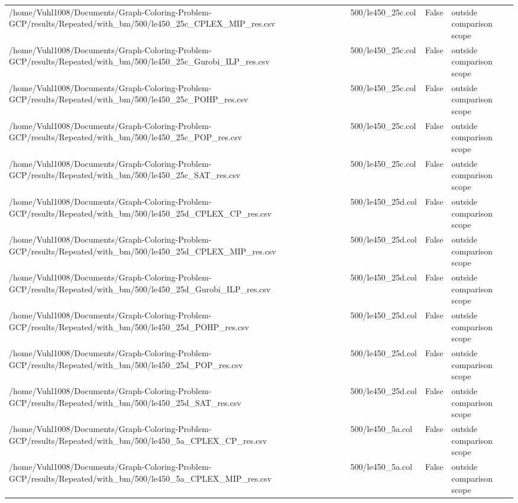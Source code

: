 \begin{table}[htbp]
\begin{tabular}{llll}
/home/Vuhl1008/Documents/Graph-Coloring-Problem-GCP/results/Repeated/with\_bm/500/le450\_25c\_CPLEX\_MIP\_res.csv & 500/le450\_25c.col & False & outside comparison scope \\
/home/Vuhl1008/Documents/Graph-Coloring-Problem-GCP/results/Repeated/with\_bm/500/le450\_25c\_Gurobi\_ILP\_res.csv & 500/le450\_25c.col & False & outside comparison scope \\
/home/Vuhl1008/Documents/Graph-Coloring-Problem-GCP/results/Repeated/with\_bm/500/le450\_25c\_POHP\_res.csv & 500/le450\_25c.col & False & outside comparison scope \\
/home/Vuhl1008/Documents/Graph-Coloring-Problem-GCP/results/Repeated/with\_bm/500/le450\_25c\_POP\_res.csv & 500/le450\_25c.col & False & outside comparison scope \\
/home/Vuhl1008/Documents/Graph-Coloring-Problem-GCP/results/Repeated/with\_bm/500/le450\_25c\_SAT\_res.csv & 500/le450\_25c.col & False & outside comparison scope \\
/home/Vuhl1008/Documents/Graph-Coloring-Problem-GCP/results/Repeated/with\_bm/500/le450\_25d\_CPLEX\_CP\_res.csv & 500/le450\_25d.col & False & outside comparison scope \\
/home/Vuhl1008/Documents/Graph-Coloring-Problem-GCP/results/Repeated/with\_bm/500/le450\_25d\_CPLEX\_MIP\_res.csv & 500/le450\_25d.col & False & outside comparison scope \\
/home/Vuhl1008/Documents/Graph-Coloring-Problem-GCP/results/Repeated/with\_bm/500/le450\_25d\_Gurobi\_ILP\_res.csv & 500/le450\_25d.col & False & outside comparison scope \\
/home/Vuhl1008/Documents/Graph-Coloring-Problem-GCP/results/Repeated/with\_bm/500/le450\_25d\_POHP\_res.csv & 500/le450\_25d.col & False & outside comparison scope \\
/home/Vuhl1008/Documents/Graph-Coloring-Problem-GCP/results/Repeated/with\_bm/500/le450\_25d\_POP\_res.csv & 500/le450\_25d.col & False & outside comparison scope \\
/home/Vuhl1008/Documents/Graph-Coloring-Problem-GCP/results/Repeated/with\_bm/500/le450\_25d\_SAT\_res.csv & 500/le450\_25d.col & False & outside comparison scope \\
/home/Vuhl1008/Documents/Graph-Coloring-Problem-GCP/results/Repeated/with\_bm/500/le450\_5a\_CPLEX\_CP\_res.csv & 500/le450\_5a.col & False & outside comparison scope \\
/home/Vuhl1008/Documents/Graph-Coloring-Problem-GCP/results/Repeated/with\_bm/500/le450\_5a\_CPLEX\_MIP\_res.csv & 500/le450\_5a.col & False & outside comparison scope \\

\end{tabular}
\end{table}
